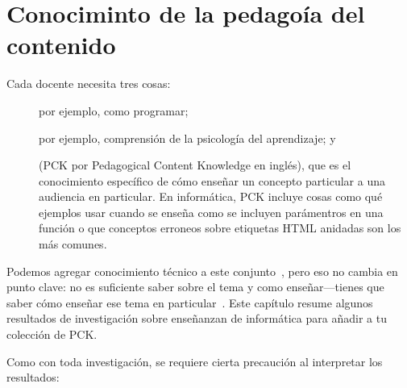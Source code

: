 \chapter{Conociminto de la pedagoía del contenido}\label{s:pck}

Cada docente necesita tres cosas:

\begin{description}

\item[]
  por ejemplo, como programar;

\item[]
  por ejemplo, comprensión de la psicología del aprendizaje;
  y

\item[]
  (PCK por Pedagogical Content Knowledge en inglés),
  que es el conocimiento específico de cómo enseñar un concepto particular a una audiencia en particular. 
  En informática,
  PCK incluye cosas como qué ejemplos usar cuando se enseña como se incluyen parámentros en una función o que conceptos erroneos sobre etiquetas HTML anidadas son los más comunes.
\end{description}

Podemos agregar conocimiento técnico a este conjunto~\cite{Koeh2013},
pero eso no cambia en punto clave: no es suficiente saber sobre el tema y como enseñar---tienes que saber cómo enseñar ese tema en particular~\cite{Maye2004}.
Este capítulo resume algunos resultados de investigación sobre enseñanzan de informática para añadir a tu colección de PCK.

Como con toda investigación,
se requiere cierta precaución al interpretar los resultados:

